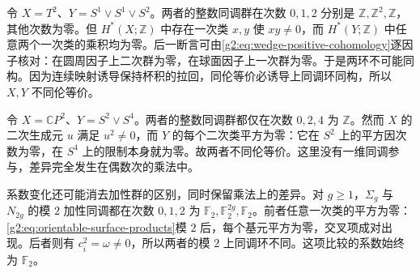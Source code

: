\begin{example}\label{g2:exm:torus-wedge-ring}
	令 \(X=T^2\)、\(Y=S^1\vee S^1\vee S^2\)。两者的整数同调群在次数 \(0,1,2\) 分别是 \(\mathbb Z,\mathbb Z^2,\mathbb Z\)，其他次数为零。但 \(H^*(X;\mathbb Z)\) 中存在一次类 \(x,y\) 使 \(xy\ne0\)，而 \(H^*(Y;\mathbb Z)\) 中任意两个一次类的乘积均为零。后一断言可由\eqref{g2:eq:wedge-positive-cohomology}逐因子核对：在圆周因子上二次群为零，在球面因子上一次群为零。于是两环不可能同构。因为连续映射诱导保持杯积的拉回，同伦等价必诱导上同调环同构，所以 \(X,Y\) 不同伦等价。
\end{example}

\begin{example}\label{g2:exm:projective-plane-wedge-ring}
	令 \(X=\mathbb CP^2\)、\(Y=S^2\vee S^4\)。两者的整数同调群都仅在次数 \(0,2,4\) 为 \(\mathbb Z\)。然而 \(X\) 的二次生成元 \(u\) 满足 \(u^2\ne0\)，而 \(Y\) 的每个二次类平方为零：它在 \(S^2\) 上的平方因次数为零，在 \(S^4\) 上的限制本身就为零。故两者不同伦等价。这里没有一维同调参与，差异完全发生在偶数次的乘法中。
\end{example}

系数变化还可能消去加性群的区别，同时保留乘法上的差异。对 \(g\geq1\)，\(\Sigma_g\) 与 \(N_{2g}\) 的模 \(2\) 加性同调都在次数 \(0,1,2\) 为 \(\mathbb F_2,\mathbb F_2^{2g},\mathbb F_2\)。前者任意一次类的平方为零：\eqref{g2:eq:orientable-surface-products}模 \(2\) 后，每个基元平方为零，交叉项成对出现。后者则有 \(c_i^2=\omega\ne0\)，所以两者的模 \(2\) 上同调环不同。这项比较的系数始终为 \(\mathbb F_2\)。
